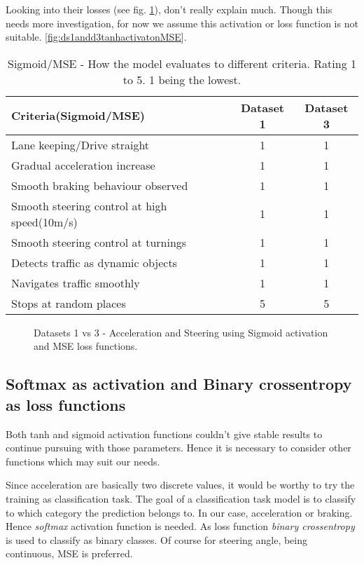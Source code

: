 Looking into their losses (see fig. \ref{fig:ds1andd3SigactivatonMSE}), don't really
explain much. Though this needs more investigation, for now we assume this activation or
loss function is not suitable.
\ref{fig:ds1andd3tanhactivatonMSE}.
\begin{table}[h]
    \centering
\begin{tabular}{lcc}
    \toprule
    Criteria(Sigmoid/MSE) & Dataset 1 & Dataset 3 \\\midrule
    Lane keeping/Drive straight  & 1 & 1  \\
    Gradual acceleration increase & 1 & 1\\
    Smooth braking behaviour observed & 1 & 1 \\
    Smooth steering control at high speed(10m/s) & 1 & 1 \\
    Smooth steering control at turnings & 1 & 1\\
    Detects traffic as dynamic objects & 1 & 1\\
    Navigates traffic smoothly & 1 & 1\\
    Stops at random places & 5 & 5 \\\bottomrule
\end{tabular}
\caption{Sigmoid/MSE - How the model evaluates to different criteria. Rating 1 to 5. 1
being the lowest.}
\label{table:sigmse}
\end{table}

\begin{figure}[h]
	\centering
    \def\svgwidth{\textwidth}
    
    \caption{Datasets 1 vs 3 - Acceleration and Steering using Sigmoid activation and MSE loss
    functions.}
    \label{fig:ds1andd3SigactivatonMSE}
\end{figure}

\subsection{Softmax as activation and Binary crossentropy as loss functions}
Both tanh and sigmoid activation functions couldn't give stable results to continue
pursuing with those parameters. Hence it is necessary to consider other functions which
may suit our needs.

Since acceleration are basically two discrete values, it would be worthy to try the
training as classification task. The goal of a classification task model is to classify to
which category the prediction belongs to. In our case, acceleration or braking. Hence
\textit{softmax} activation function is needed. As loss function \textit{binary
crossentropy} is used to classify as binary classes. Of course for steering angle,
being continuous, MSE is preferred.

